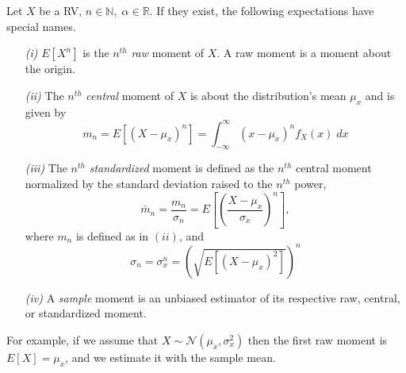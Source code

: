 \documentclass{tufte-handout}
\begin{document}
\begin{definition}
  Let $X$ be a RV, $n \in \mathbb{N}, \; \alpha \in \mathbb{R}.$  If they exist, the following expectations have special names.  
  \begin{enumerate}
    \item[\it (i)] $E[X^n]$ is the $n^{th}$ \textit{raw} moment of $X.$ A raw moment is a moment about the origin. 
    \item[\it (ii)] The $n^{th}$ \textit{central} moment of $X$ is about the distribution's mean $\mu_x$ and is given by  
    $$m_n=E[(X-\mu_x)^n]  = \int_{-\infty}^\infty (x -\mu_x)^n f_X(x) \; dx $$
    \item[\it (iii)] The $n^{th}$ \textit{standardized} moment is defined as the $n^{th}$ central moment normalized by the standard deviation raised to the $n^{th}$ power,
    $$\bar m_n  = \frac{m_n}{\sigma_n} = E \left[ \left( \frac{X-\mu_x}{\sigma_x}  \right)^n \right],  $$
    where $m_n$ is defined as in $(ii)$, and $$\sigma_n = \sigma_x^n = \left( \sqrt{E[(X-\mu_x)^2]} {} \right)^n $$ 
    \item[\it (iv)] A \textit{sample} moment is an unbiased estimator of its respective raw, central, or standardized moment.
  \end{enumerate}
\end{definition}
\begin{example}
  For example, if we assume that $X \sim \mathcal{N}(\mu_x, \sigma^2_x)$ then the first raw moment is $E[X] = \mu_x$, and we estimate it with the sample mean.


\end{example}
\end{document}
